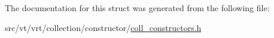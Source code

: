 The documentation for this struct was generated from the following file\+:\begin{DoxyCompactItemize}
\item 
src/vt/vrt/collection/constructor/\hyperlink{coll__constructors_8h}{coll\+\_\+constructors.\+h}\end{DoxyCompactItemize}
